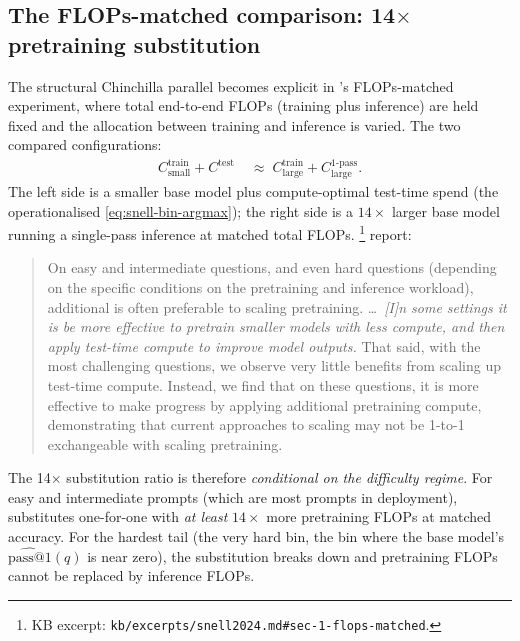 \subsection{The FLOPs-matched comparison: 14$\times$ pretraining substitution}
\label{sec:snell-flops-matched}

The structural Chinchilla parallel becomes explicit in
\citet[\S 6]{snell2024}'s FLOPs-matched experiment, where total
end-to-end FLOPs (training plus inference) are held fixed and the
allocation between training and inference is varied. The two compared
configurations:
\begin{align}
  C_\text{small}^\text{train} + C^\text{test}
    &\;\approx\; C_\text{large}^\text{train} + C_\text{large}^\text{1-pass}.
  \label{eq:flops-matched}
\end{align}
The left side is a smaller base model plus compute-optimal test-time
spend (the operationalised \cref{eq:snell-bin-argmax}); the right side
is a $14\times$ larger base model running a single-pass inference at
matched total FLOPs. \citet[\S 1]{snell2024}%
\footnote{KB excerpt: \texttt{kb/excerpts/snell2024.md\#sec-1-flops-matched}.}
report:
\begin{quote}
On easy and intermediate questions, and even hard questions
(depending on the specific conditions on the pretraining and inference
workload), additional  is often preferable to scaling
pretraining. \ldots\ \emph{[I]n some settings it is be more effective to
pretrain smaller models with less compute, and then apply test-time
compute to improve model outputs.} That said, with the most challenging
questions, we observe very little benefits from scaling up test-time
compute. Instead, we find that on these questions, it is more effective
to make progress by applying additional pretraining compute,
demonstrating that current approaches to scaling  may
not be 1-to-1 exchangeable with scaling pretraining.
\end{quote}

The 14$\times$ substitution ratio is therefore \emph{conditional on the
difficulty regime}. For easy and intermediate prompts (which are most
prompts in deployment),  substitutes one-for-one with
\emph{at least} $14\times$ more pretraining FLOPs at matched accuracy.
For the hardest tail (the very hard bin, the bin where the base model's
$\widehat{\mathrm{pass@}1}(q)$ is near zero), the substitution breaks
down and pretraining FLOPs cannot be replaced by inference FLOPs.

